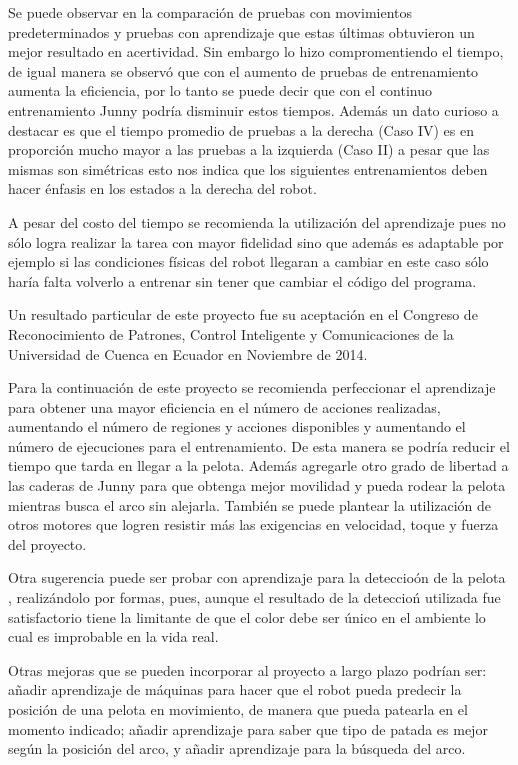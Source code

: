 Se puede observar en la comparaci\'on de pruebas con movimientos predeterminados y pruebas con aprendizaje que estas \'ultimas obtuvieron un mejor resultado en acertividad. Sin embargo  lo hizo compromentiendo el tiempo, de igual manera se observ\'o que con el aumento de pruebas de entrenamiento aumenta la eficiencia, por lo tanto se puede decir que con el continuo entrenamiento Junny podr\'ia disminuir estos tiempos. Adem\'as un dato curioso a destacar es que el tiempo promedio de pruebas a la derecha (Caso IV) es en proporci\'on mucho mayor a las pruebas a la izquierda (Caso II) a pesar que las mismas son sim\'etricas esto nos indica que los siguientes entrenamientos deben hacer \'enfasis en los estados a la derecha del robot. 

A pesar del costo del tiempo se recomienda la utilizaci\'on del aprendizaje pues no s\'olo logra realizar la tarea con mayor fidelidad sino que adem\'as es adaptable por ejemplo si las condiciones f\'isicas del robot llegaran a cambiar en este caso s\'olo haría falta volverlo a entrenar sin tener que cambiar el código del programa.

Un resultado particular de este proyecto fue su aceptaci\'on en el Congreso de Reconocimiento de Patrones, Control Inteligente y Comunicaciones de la Universidad de Cuenca en Ecuador en Noviembre de 2014.

Para la continuaci\'on de este proyecto se recomienda perfeccionar el aprendizaje para obtener una mayor eficiencia en el n\'umero de acciones realizadas, aumentando el número de regiones y acciones disponibles y aumentando el número de ejecuciones para el entrenamiento. De esta manera se podría reducir el tiempo que tarda en llegar a la pelota. Además agregarle otro grado de libertad a las 
caderas de Junny para que obtenga mejor movilidad y pueda rodear la pelota mientras busca el arco sin alejarla. Tambi\'en se puede plantear la utilizaci\'on de otros motores que logren resistir m\'as las exigencias en velocidad, toque y fuerza del proyecto.

Otra sugerencia puede ser probar con aprendizaje para la deteccio\'on de la pelota , realiz\'andolo por formas, pues, aunque el resultado de la deteccio\'n utilizada fue satisfactorio tiene la limitante de que el color debe ser \'unico en el ambiente lo cual es improbable en la vida real.  

Otras mejoras que se pueden incorporar al proyecto a largo plazo podrían ser: añadir aprendizaje de m\'aquinas para hacer que el robot pueda predecir la posición de una pelota en movimiento, de manera que pueda patearla en el momento indicado; a\~nadir aprendizaje para saber que tipo de patada es mejor seg\'un la posición del arco, y a\~nadir aprendizaje para la búsqueda del arco.

